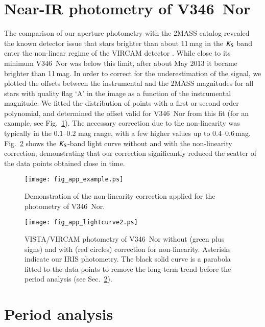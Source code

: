\documentclass{aa}
\begin{document}
\begin{appendix}

\section{Near-IR photometry of V346~Nor}
\label{sec:appendix_a}

The comparison of our aperture photometry with the 2MASS catalog
revealed the known detector issue that stars brighter than about
11\,mag in the $K_{\rm S}$ band enter the non-linear regime of the
VIRCAM detector \citep{saito2012}. While close to its minimum V346~Nor
was below this limit, after about May 2013 it became brighter than
11\,mag. In order to correct for the underestimation of the signal, we
plotted the offsets between the instrumental and the 2MASS magnitudes
for all stars with quality flag `A' in the image as a function of the
instrumental magnitude. We fitted the distribution of points with a
first or second order polynomial, and determined the offset valid for
V346~Nor from this fit (for an example, see
Fig.~\ref{fig:nonlinearity1}). The necessary correction due to the
non-linearity was typically in the 0.1--0.2 mag range, with a few
higher values up to 0.4--0.6\,mag. Fig.~\ref{fig:nonlinearity2} shows
the $K_{\rm S}$-band light curve without and with the non-linearity
correction, demonstrating that our correction significantly reduced
the scatter of the data points obtained close in time.

\begin{figure}
\centering
\texttt{[image: fig\_app\_example.ps]}
\caption{Demonstration of the non-linearity correction applied for the
  photometry of V346~Nor.}
\label{fig:nonlinearity1}
\end{figure}

\begin{figure}
\centering
\texttt{[image: fig\_app\_lightcurve2.ps]}
\caption{VISTA/VIRCAM photometry of V346~Nor without (green plus
  signs) and with (red circles) correction for
  non-linearity. Asterisks indicate our IRIS photometry. The black
  solid curve is a parabola fitted to the data points to remove the
  long-term trend before the period analysis (see
  Sec.~\ref{sec:appendix_b}).}
\label{fig:nonlinearity2}
\end{figure}


\section{Period analysis}
\label{sec:appendix_b}


\end{appendix}
\end{document}

